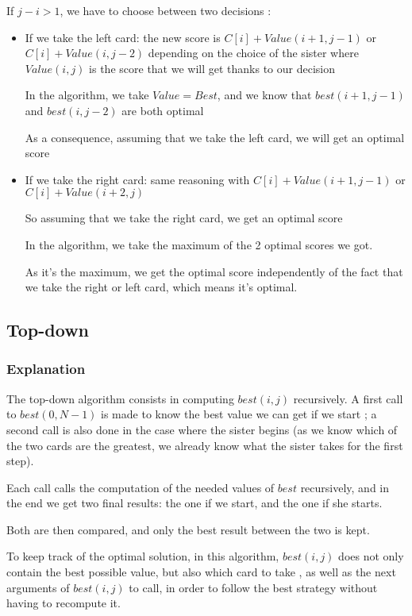\documentclass[11pt]{article}
\begin{document}
If $j-i > 1$, we have to choose between two decisions :
\begin{itemize}
	\item If we take the left card:
		the new score is $C[i] + Value(i+1, j-1)$
		or $C[i] + Value(i, j-2)$ 
		depending on the choice of the sister
		where $Value(i, j)$ is the score that we will get thanks to our decision

		In the algorithm, we take $Value=Best$, and we know that $best(i+1, j-1)$ and $best(i, j-2)$ are both optimal

		As a consequence, assuming that we take the left card, we will get an optimal score

	\item If we take the right card:
		same reasoning with $C[i] + Value(i+1, j-1)$
		or $C[i] + Value(i+2, j)$

		So assuming that we take the right card, we get an optimal score
	
		In the algorithm, we take the maximum of the 2 optimal scores we got.

		As it's the maximum, we get the optimal score independently of the
		fact that we take the right or left card, which means it's optimal.
\end{itemize}



\subsection{Top-down}
\subsubsection{Explanation}
The top-down algorithm consists in computing $best(i, j)$ recursively.
A first call to $best(0, N-1)$ is made to know the best value we can get
if we start ; a second call is also done in the case where the sister begins
(as we know which of the two cards are the greatest, we already know what the
sister takes for the first step).

Each call calls the computation of the needed values of $best$ recursively, and
in the end we get two final results: the one if we start,
and the one if she starts.

Both are then compared, and only the best result between the two is kept.

To keep track of the optimal solution, in this algorithm, $best(i, j)$ does not
only contain the best possible value, but also which card to take
, as well as the next arguments of $best(i, j)$ to call, 
in order to follow the best strategy without having to recompute it.
\end{document}
